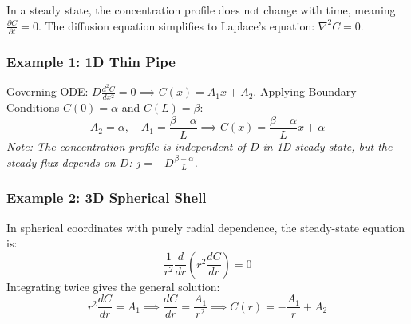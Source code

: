 In a steady state, the concentration profile does not change with time, meaning $\frac{\partial C}{\partial t} = 0$. The diffusion equation simplifies to Laplace's equation: $\nabla^{2}C = 0$.

\subsubsection{Example 1: 1D Thin Pipe}
\begin{center}
\end{center}
Governing ODE: $D\frac{d^{2}C}{dx^{2}} = 0 \implies C(x) = A_{1}x + A_{2}$.
Applying Boundary Conditions $C(0) = \alpha$ and $C(L) = \beta$:
\[
A_2 = \alpha, \quad A_1 = \frac{\beta - \alpha}{L} \implies C(x) = \frac{\beta - \alpha}{L}x + \alpha
\]
\textit{Note: The concentration profile is independent of $D$ in 1D steady state, but the steady flux depends on $D$: $j = -D \frac{\beta-\alpha}{L}$.}

\subsubsection{Example 2: 3D Spherical Shell}
\begin{center}
\end{center}

In spherical coordinates with purely radial dependence, the steady-state equation is:
\[
\frac{1}{r^{2}}\frac{d}{dr}\left(r^{2}\frac{dC}{dr}\right) = 0
\]
Integrating twice gives the general solution:
\[
r^{2}\frac{dC}{dr} = A_{1} \implies \frac{dC}{dr} = \frac{A_1}{r^2} \implies C(r) = -\frac{A_{1}}{r} + A_{2}
\]


